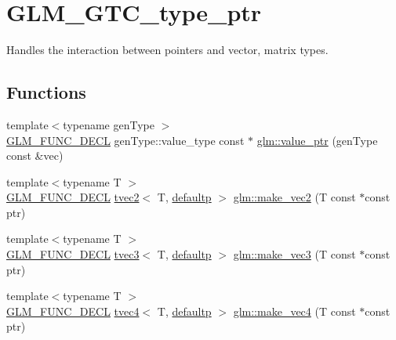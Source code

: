 \hypertarget{group__gtc__type__ptr}{}\section{G\+L\+M\+\_\+\+G\+T\+C\+\_\+type\+\_\+ptr}
\label{group__gtc__type__ptr}


Handles the interaction between pointers and vector, matrix types.  


\subsection*{Functions}
\begin{DoxyCompactItemize}
\item 
{\footnotesize template$<$typename gen\+Type $>$ }\\\mbox{\hyperlink{setup_8hpp_ab2d052de21a70539923e9bcbf6e83a51}{G\+L\+M\+\_\+\+F\+U\+N\+C\+\_\+\+D\+E\+CL}} gen\+Type\+::value\+\_\+type const  $\ast$ \mbox{\hyperlink{group__gtc__type__ptr_gaf019636bb8bd7c9efb7c7ce3bb23bcfc}{glm\+::value\+\_\+ptr}} (gen\+Type const \&vec)
\item 
{\footnotesize template$<$typename T $>$ }\\\mbox{\hyperlink{setup_8hpp_ab2d052de21a70539923e9bcbf6e83a51}{G\+L\+M\+\_\+\+F\+U\+N\+C\+\_\+\+D\+E\+CL}} \mbox{\hyperlink{structglm_1_1tvec2}{tvec2}}$<$ T, \mbox{\hyperlink{namespaceglm_a0f04f086094c747d227af4425893f545a9d21ccd8b5a009ec7eb7677befc3bf51}{defaultp}} $>$ \mbox{\hyperlink{group__gtc__type__ptr_ga5f7393c30970c5949be13ceb525093a6}{glm\+::make\+\_\+vec2}} (T const $\ast$const ptr)
\item 
{\footnotesize template$<$typename T $>$ }\\\mbox{\hyperlink{setup_8hpp_ab2d052de21a70539923e9bcbf6e83a51}{G\+L\+M\+\_\+\+F\+U\+N\+C\+\_\+\+D\+E\+CL}} \mbox{\hyperlink{structglm_1_1tvec3}{tvec3}}$<$ T, \mbox{\hyperlink{namespaceglm_a0f04f086094c747d227af4425893f545a9d21ccd8b5a009ec7eb7677befc3bf51}{defaultp}} $>$ \mbox{\hyperlink{group__gtc__type__ptr_ga86f4bc63570db86346db2e567fb760f6}{glm\+::make\+\_\+vec3}} (T const $\ast$const ptr)
\item 
{\footnotesize template$<$typename T $>$ }\\\mbox{\hyperlink{setup_8hpp_ab2d052de21a70539923e9bcbf6e83a51}{G\+L\+M\+\_\+\+F\+U\+N\+C\+\_\+\+D\+E\+CL}} \mbox{\hyperlink{structglm_1_1tvec4}{tvec4}}$<$ T, \mbox{\hyperlink{namespaceglm_a0f04f086094c747d227af4425893f545a9d21ccd8b5a009ec7eb7677befc3bf51}{defaultp}} $>$ \mbox{\hyperlink{group__gtc__type__ptr_ga152345176b8951c15711f6ed4f6fc237}{glm\+::make\+\_\+vec4}} (T const $\ast$const ptr)

\end{DoxyCompactItemize}
